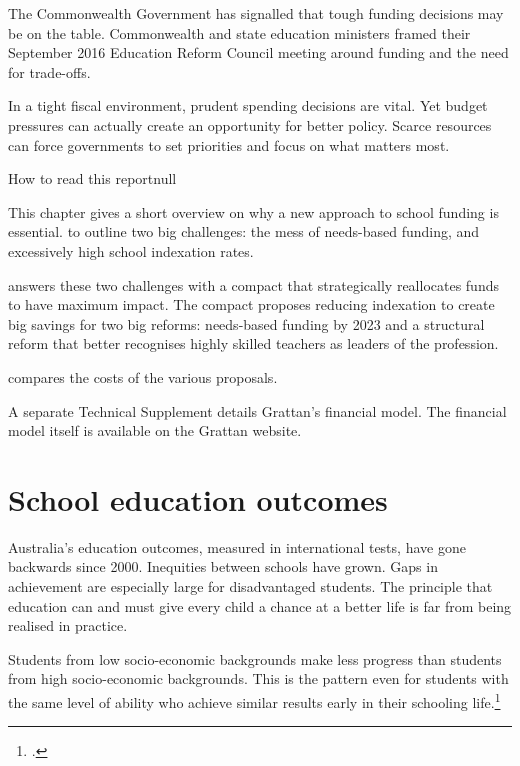 \documentclass{grattan}
\begin{document}
The Commonwealth Government has signalled that tough funding decisions may be on the table.
Commonwealth and state education ministers framed their September 2016 Education Reform Council meeting around funding and the need for trade-offs.

In a tight fiscal environment, prudent spending decisions are vital.
Yet budget pressures can actually create an opportunity for better policy.
Scarce resources can force governments to set priorities and focus on what matters most.

\begin{addsmallbox}[p]{How to read this report}{null}

This chapter gives a short overview on why a new approach to school funding is essential.
 to  outline two big challenges: the mess of needs-based funding, and excessively high school indexation rates.

 answers these two challenges with a compact that strategically reallocates funds to have maximum impact.
The compact proposes reducing indexation to create big savings for two big reforms: needs-based funding by 2023 and a structural reform that better recognises highly skilled teachers as leaders of the profession.

 compares the costs of the various proposals.

A separate Technical Supplement details Grattan's financial model.
The financial model itself is available on the Grattan website.
\end{addsmallbox}

\section{School education outcomes}\label{sec:school-education-outcomes}
Australia's education outcomes, measured in international tests, have gone backwards since 2000.
Inequities between schools have grown.
Gaps in achievement are especially large for disadvantaged students. The principle that education can and must give every child a chance at a better life is far from being realised in practice.

Students from low socio-economic backgrounds make less progress than students from high socio-economic backgrounds. This is the pattern even for students with the same level of ability who achieve similar results early in their schooling life.\footcite{Goss2016Wideninggapswhat}
\end{document}
